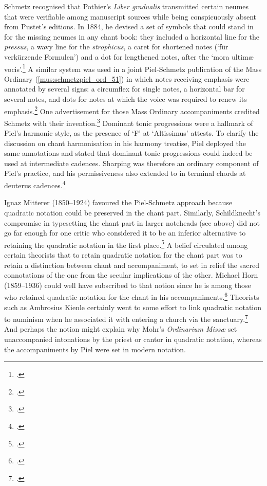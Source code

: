 Schmetz recognised that Pothier's \emph{Liber gradualis} transmitted certain neumes that were verifiable among manuscript sources while being conspicuously absent from Pustet's editions.
In 1884, he devised a set of symbols that could stand in for the missing neumes in any chant book: they included a horizontal line for the \emph{pressus}, a wavy line for the \emph{strophicus}, a caret for shortened notes (`für verkürzende Formulen') and a dot for lengthened notes, after the `mora ultimæ vocis'.\footcite[17]{SchmetzDomPothierLiber1884}
A similar system was used in a joint Piel-Schmetz publication of the Mass Ordinary (\cref{mus:schmetzpiel_ord_51}) in which notes receiving emphasis were annotated by several signs: a circumflex for single notes, a horizontal bar for several notes, and dots for notes at which the voice was required to renew its emphasis.\footcite[pp.~v, 51]{PielOrgelbegleitungOrdinariumMissae1887}
One advertisement for those Mass Ordinary accompaniments credited Schmetz with their invention.\footcite[unpaginated advertisement]{OrgelbegleitungOrdinariumMissae1888}
Dominant \rightarrow{} tonic progressions were a hallmark of Piel's harmonic style, as the presence of `F'\kern 1pt\sharp{} at `Altissimus' attests.
To clarify the discussion on chant harmonisation in his harmony treatise, Piel deployed the same annotations and stated that dominant \rightarrow{} tonic progressions could indeed be used at intermediate cadences.
Sharping was therefore an ordinary component of Piel's practice, and his permissiveness also extended to \sharp{} in terminal chords at deuterus cadences.\footcite[240--44]{PielHarmonieLehreUnterbesonderer1903}
\nowidow[2]

Ignaz Mitterer (1850--1924) favoured the Piel-Schmetz approach because quadratic notation could be preserved in the chant part.
Similarly, Schildknecht's compromise in typesetting the chant part in larger noteheads (see  above) did not go far enough for one critic who considered it to be an inferior alternative to retaining the quadratic notation in the first place.\footnote{.}
A belief circulated among certain theorists that to retain quadratic notation for the chant part was to retain a distinction between chant and accompaniment, to set in relief the sacred connotations of the one from the secular implications of the other.
%
Michael Horn (1859--1936) could well have subscribed to that notion since he is among those who retained quadratic notation for the chant in his accompaniments.\footcite[p.~3 and \emph{passim}]{HornOrdinariummissaeorgano1898}
Theorists such as Ambrosius Kienle certainly went to some effort to link quadratic notation to numinism when he associated it with entering a church via the sanctuary.\footcites[13]{KienleChoralschuleHandbuchzur1899}[Evidently cited from a previous edition of Kienle's work in][31--2]{MohrEinleitungundQuellennachweis1891}
And perhaps the notion might explain why Mohr's \emph{Ordinarium Missæ} set unaccompanied intonations by the priest or cantor in quadratic notation, whereas the accompaniments by Piel were set in modern notation.


